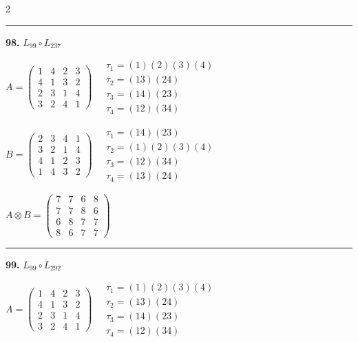 \begin{multicols}{2}
\vspace{0.3em}
\hrule
\vspace{0.3em}

\noindent\textbf{98.} $L_{99} \circ L_{237}$

$A = \begin{pmatrix} 1 & 4 & 2 & 3 \\ 4 & 1 & 3 & 2 \\ 2 & 3 & 1 & 4 \\ 3 & 2 & 4 & 1 \end{pmatrix} \quad \begin{matrix} \tau_{1}=(1)(2)(3)(4) \\ \tau_{2}=(1 3)(2 4) \\ \tau_{3}=(1 4)(2 3) \\ \tau_{4}=(1 2)(3 4) \end{matrix}$

$B = \begin{pmatrix} 2 & 3 & 4 & 1 \\ 3 & 2 & 1 & 4 \\ 4 & 1 & 2 & 3 \\ 1 & 4 & 3 & 2 \end{pmatrix} \quad \begin{matrix} \tau_{1}=(1 4)(2 3) \\ \tau_{2}=(1)(2)(3)(4) \\ \tau_{3}=(1 2)(3 4) \\ \tau_{4}=(1 3)(2 4) \end{matrix}$

$A \otimes B = \begin{pmatrix} 7 & 7 & 6 & 8 \\ 7 & 7 & 8 & 6 \\ 6 & 8 & 7 & 7 \\ 8 & 6 & 7 & 7 \end{pmatrix}$

\vspace{0.3em}
\hrule
\vspace{0.3em}

\noindent\textbf{99.} $L_{99} \circ L_{292}$

$A = \begin{pmatrix} 1 & 4 & 2 & 3 \\ 4 & 1 & 3 & 2 \\ 2 & 3 & 1 & 4 \\ 3 & 2 & 4 & 1 \end{pmatrix} \quad \begin{matrix} \tau_{1}=(1)(2)(3)(4) \\ \tau_{2}=(1 3)(2 4) \\ \tau_{3}=(1 4)(2 3) \\ \tau_{4}=(1 2)(3 4) \end{matrix}$


\end{multicols}
